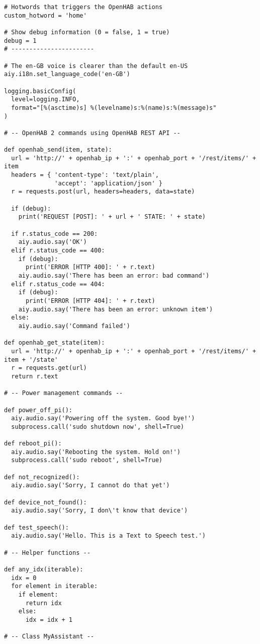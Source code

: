 \begin{lstlisting}[style=PythonCode]
# Hotwords that triggers the OpenHAB actions
custom_hotword = 'home'

# Show debug information (0 = false, 1 = true)
debug = 1
# -----------------------

# The en-GB voice is clearer than the default en-US
aiy.i18n.set_language_code('en-GB')

logging.basicConfig(
  level=logging.INFO,
  format="[%(asctime)s] %(levelname)s:%(name)s:%(message)s"
)

# -- OpenHAB 2 commands using OpenHAB REST API --

def openhab_send(item, state):
  url = 'http://' + openhab_ip + ':' + openhab_port + '/rest/items/' + item
  headers = { 'content-type': 'text/plain',
              'accept': 'application/json' }
  r = requests.post(url, headers=headers, data=state)

  if (debug):
    print('REQUEST [POST]: ' + url + ' STATE: ' + state)

  if r.status_code == 200:
    aiy.audio.say('OK')
  elif r.status_code == 400:
    if (debug):
      print('ERROR [HTTP 400]: ' + r.text)
    aiy.audio.say('There has been an error: bad command')
  elif r.status_code == 404:
    if (debug):
      print('ERROR [HTTP 404]: ' + r.text)
    aiy.audio.say('There has been an error: unknown item')
  else:
    aiy.audio.say('Command failed')

def openhab_get_state(item):
  url = 'http://' + openhab_ip + ':' + openhab_port + '/rest/items/' + item + '/state'
  r = requests.get(url)
  return r.text

# -- Power management commands --

def power_off_pi():
  aiy.audio.say('Powering off the system. Good bye!')
  subprocess.call('sudo shutdown now', shell=True)

def reboot_pi():
  aiy.audio.say('Rebooting the system. Hold on!')
  subprocess.call('sudo reboot', shell=True)

def not_recognized():
  aiy.audio.say('Sorry, I cannot do that yet')

def device_not_found():
  aiy.audio.say('Sorry, I don\'t know that device')

def test_speech():
  aiy.audio.say('Hello. This is a Text to Speech test.')

# -- Helper functions --

def any_idx(iterable):
  idx = 0
  for element in iterable:
    if element:
      return idx
    else:
      idx = idx + 1

# -- Class MyAssistant --


\end{lstlisting}
